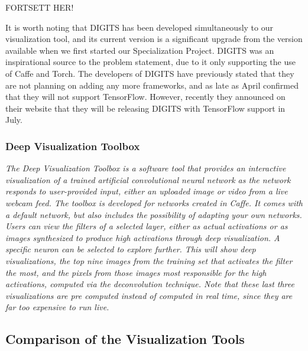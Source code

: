 FORTSETT HER!

It is worth noting that DIGITS has been developed simultaneously to our visualization tool, and its current version is a significant upgrade from the version available when we first started our Specialization Project. DIGITS was an inspirational source to the problem statement, due to it only supporting the use of Caffe and Torch. The developers of DIGITS have previously stated that they are not planning on adding any more frameworks, and as late as April confirmed that they will not support TensorFlow. However, recently they announced on their website that they will be releasing DIGITS with TensorFlow support in July.

\begin{comment}
Drawbacks:
- Still does not support Keras.
- No advanced visualizations.
\end{comment}

\subsubsection{Deep Visualization Toolbox}

\textit{The Deep Visualization Toolbox \cite{yosinski-deepvis} is a software tool that provides an interactive visualization of a trained artificial convolutional neural network as the network responds to user-provided input, either an uploaded image or video from a live webcam feed. The toolbox is developed for networks created in Caffe. It comes with a default network, but also includes the possibility of adapting your own networks. Users can view the filters of a selected layer, either as actual activations or as images synthesized to produce high activations through deep visualization. A specific neuron can be selected to explore further. This will show deep visualizations, the top nine images from the training set that activates the filter the most, and the pixels from those images most responsible for the high activations, computed via the deconvolution technique. Note that these last three visualizations are pre computed instead of computed in real time, since they are far too expensive to run live.}


\subsection{Comparison of the Visualization Tools}


